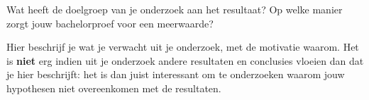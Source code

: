 Wat heeft de doelgroep van je onderzoek aan het resultaat? Op welke manier zorgt jouw bachelorproef voor een meerwaarde?

Hier beschrijf je wat je verwacht uit je onderzoek, met de motivatie waarom. Het is \textbf{niet} erg indien uit je onderzoek andere resultaten en conclusies vloeien dan dat je hier beschrijft: het is dan juist interessant om te onderzoeken waarom jouw hypothesen niet overeenkomen met de resultaten.

